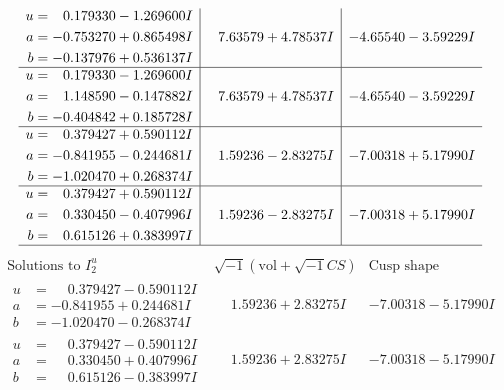 \documentclass[1p]{elsarticle_modified}
\theoremstyle{definition}
\newcommand{\I}{\sqrt{-1}}
\begin{document}
$$\begin{array}{c|c|c}
\begin{aligned}
u &= \phantom{-}0.179330 - 1.269600 I \\
a &= -0.753270 + 0.865498 I \\
b &= -0.137976 + 0.536137 I\end{aligned}
 & \phantom{-}7.63579 + 4.78537 I & -4.65540 - 3.59229 I \\ \hline\begin{aligned}
u &= \phantom{-}0.179330 - 1.269600 I \\
a &= \phantom{-}1.148590 - 0.147882 I \\
b &= -0.404842 + 0.185728 I\end{aligned}
 & \phantom{-}7.63579 + 4.78537 I & -4.65540 - 3.59229 I \\ \hline\begin{aligned}
u &= \phantom{-}0.379427 + 0.590112 I \\
a &= -0.841955 - 0.244681 I \\
b &= -1.020470 + 0.268374 I\end{aligned}
 & \phantom{-}1.59236 - 2.83275 I & -7.00318 + 5.17990 I \\ \hline\begin{aligned}
u &= \phantom{-}0.379427 + 0.590112 I \\
a &= \phantom{-}0.330450 - 0.407996 I \\
b &= \phantom{-}0.615126 + 0.383997 I\end{aligned}
 & \phantom{-}1.59236 - 2.83275 I & -7.00318 + 5.17990 I\\
 \hline 
 \end{array}$$\newpage$$\begin{array}{c|c|c}  
\text{Solutions to }I^u_{2}& \I (\text{vol} + \sqrt{-1}CS) & \text{Cusp shape}\\
 \hline 
\begin{aligned}
u &= \phantom{-}0.379427 - 0.590112 I \\
a &= -0.841955 + 0.244681 I \\
b &= -1.020470 - 0.268374 I\end{aligned}
 & \phantom{-}1.59236 + 2.83275 I & -7.00318 - 5.17990 I \\ \hline\begin{aligned}
u &= \phantom{-}0.379427 - 0.590112 I \\
a &= \phantom{-}0.330450 + 0.407996 I \\
b &= \phantom{-}0.615126 - 0.383997 I\end{aligned}
 & \phantom{-}1.59236 + 2.83275 I & -7.00318 - 5.17990 I \\ \hline\begin{aligned}

\end{aligned}
\end{array}$$
\end{document}

